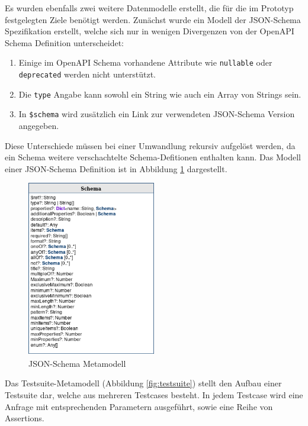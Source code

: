 Es wurden ebenfalls zwei weitere Datenmodelle erstellt, die für die im Prototyp festgelegten Ziele benötigt werden. Zunächst wurde ein Modell der JSON-Schema Spezifikation erstellt, welche sich nur in wenigen Divergenzen von der OpenAPI Schema Definition unterscheidet:

\begin{enumerate}
	\item Einige im OpenAPI Schema vorhandene Attribute wie \lstinline|nullable| oder \lstinline|deprecated| werden nicht unterstützt.
	\item Die \lstinline|type| Angabe kann sowohl ein String wie auch ein Array von Strings sein.
	\item In \lstinline|$schema| wird zusätzlich ein Link zur verwendeten JSON-Schema Version angegeben. 
\end{enumerate}

Diese Unterschiede müssen bei einer Umwandlung rekursiv aufgelöst werden, da ein Schema weitere verschachtelte Schema-Defitionen enthalten kann. Das Modell einer JSON-Schema Definition ist in Abbildung \ref{fig:jsonschema} dargestellt. \\

\begin{figure}
\centering
  \includegraphics[width=0.5\textwidth]{../images/json-schema.png}
  \caption{JSON-Schema Metamodell}
  \label{fig:jsonschema}
\end{figure}

Das Testsuite-Metamodell (Abbildung \ref{fig:testsuite}) stellt den Aufbau einer Testsuite dar, welche aus mehreren  Testcases besteht. In jedem Testcase wird eine Anfrage mit entsprechenden Parametern ausgeführt, sowie eine Reihe von Assertions.

